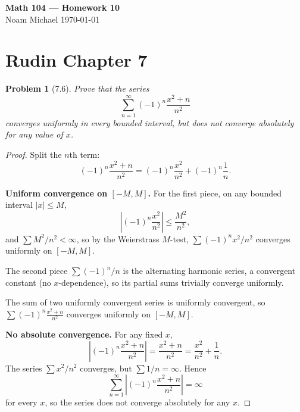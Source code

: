 \documentclass[12 pt]{article}
\newtheorem{prob}{Problem}
\begin{document}
\begin{center}
    {\Large \textbf{Math 104 --- Homework 10}}\\[0.5em]
    Noam Michael \hfill \today
\end{center}

\section*{Rudin Chapter 7}

\begin{prob}[7.6]
Prove that the series
$$
\sum_{n=1}^{\infty}(-1)^{n} \frac{x^{2}+n}{n^{2}}
$$
converges uniformly in every bounded interval, but does not converge absolutely for any value of $x$.
\end{prob}
\begin{proof}
Split the $n$th term:
$$
(-1)^n \frac{x^2 + n}{n^2} = (-1)^n \frac{x^2}{n^2} + (-1)^n \frac{1}{n}.
$$

\textbf{Uniform convergence on $[-M, M]$.} For the first piece, on any bounded interval $|x| \leq M$,
$$
\left| (-1)^n \frac{x^2}{n^2} \right| \leq \frac{M^2}{n^2},
$$
and $\sum M^2/n^2 < \infty$, so by the Weierstrass $M$-test, $\sum (-1)^n x^2/n^2$ converges uniformly on $[-M, M]$.

The second piece $\sum (-1)^n / n$ is the alternating harmonic series, a convergent constant (no $x$-dependence), so its partial sums trivially converge uniformly.

The sum of two uniformly convergent series is uniformly convergent, so $\sum (-1)^n \frac{x^2 + n}{n^2}$ converges uniformly on $[-M, M]$.

\textbf{No absolute convergence.} For any fixed $x$,
$$
\left| (-1)^n \frac{x^2 + n}{n^2} \right| = \frac{x^2 + n}{n^2} = \frac{x^2}{n^2} + \frac{1}{n}.
$$
The series $\sum x^2/n^2$ converges, but $\sum 1/n = \infty$. Hence
$$
\sum_{n=1}^{\infty} \left| (-1)^n \frac{x^2 + n}{n^2} \right| = \infty
$$
for every $x$, so the series does not converge absolutely for any $x$.
\end{proof}
\end{document}
